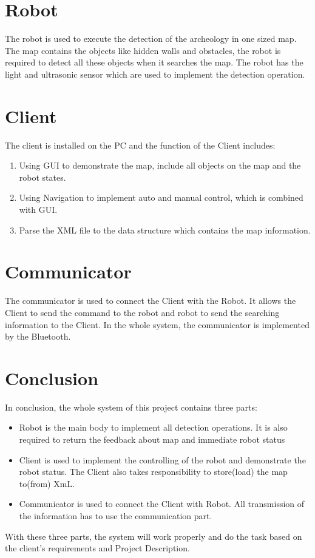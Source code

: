 \documentclass[11pt, a4paper]{report}
\begin{document}
\section{Robot}
The robot is used to execute the detection of the archeology in one sized map. The map contains the objects like hidden walls and obstacles, the robot is required to detect all these objects when it searches the map. The robot has the light and ultrasonic sensor which are used to implement the detection operation.     

\section{Client}
The client is installed on the PC and the function of the Client includes:
\begin{enumerate}
\item Using GUI to demonstrate the map, include all objects on the map and the robot states.
\item Using Navigation to implement auto and manual control, which is combined with GUI. 
\item Parse the XML file to the data structure which contains the map information.
\end{enumerate}

\section{Communicator}
The communicator is used to connect the Client with the Robot. It allows the Client to send the command to the robot and robot to send the searching information to the Client. In the whole system, the communicator is implemented by the Bluetooth.   

\section{Conclusion}
In conclusion, the whole system of this project contains three parts:
\begin{itemize}
  \item Robot is the main body to implement all detection operations. It is also required to return the feedback about map and immediate robot status 
  \item Client is used to implement the controlling of the robot and demonstrate the robot status. The Client also takes responsibility to store(load) the map to(from) XmL. 
  \item Communicator is used to connect the Client with Robot. All transmission of the information has to use the communication part. 
\end{itemize}
With these three parts, the system will work properly and do the task based on the client's requirements and Project Description.
\end{document}

